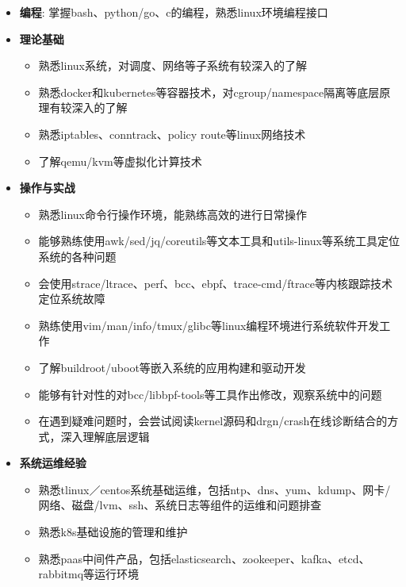 \begin{itemize}[parsep=0.2ex]
  \item \textbf{编程}: 掌握bash、python/go、c的编程，熟悉linux环境编程接口
  \item \textbf{理论基础}
    \begin{itemize}
      \item 熟悉linux系统，对调度、网络等子系统有较深入的了解
      \item 熟悉docker和kubernetes等容器技术，对cgroup/namespace隔离等底层原理有较深入的了解
      \item 熟悉iptables、conntrack、policy route等linux网络技术
      \item 了解qemu/kvm等虚拟化计算技术
    \end{itemize}
  \item \textbf{操作与实战}
    \begin{itemize}
      \item 熟悉linux命令行操作环境，能熟练高效的进行日常操作
      \item 能够熟练使用awk/sed/jq/coreutils等文本工具和utils-linux等系统工具定位系统的各种问题
      \item 会使用strace/ltrace、perf、bcc、ebpf、trace-cmd/ftrace等内核跟踪技术定位系统故障
      \item 熟练使用vim/man/info/tmux/glibc等linux编程环境进行系统软件开发工作
      \item 了解buildroot/uboot等嵌入系统的应用构建和驱动开发
      \item 能够有针对性的对bcc/libbpf-tools等工具作出修改，观察系统中的问题
      \item 在遇到疑难问题时，会尝试阅读kernel源码和drgn/crash在线诊断结合的方式，深入理解底层逻辑
    \end{itemize}
  \item \textbf{系统运维经验}
    \begin{itemize}
      \item 熟悉tlinux／centos系统基础运维，包括ntp、dns、yum、kdump、网卡/网络、磁盘/lvm、ssh、系统日志等组件的运维和问题排查
      \item 熟悉k8s基础设施的管理和维护
      \item 熟悉paas中间件产品，包括elasticsearch、zookeeper、kafka、etcd、rabbitmq等运行环境
    \end{itemize}
\end{itemize}
